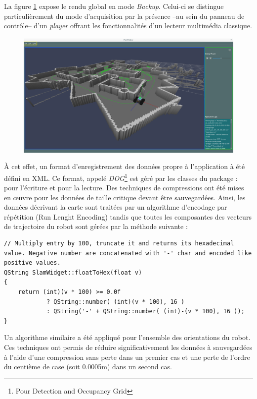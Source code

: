 La figure \ref{fig:replay} expose le rendu global en mode \emph{Backup}. 
Celui-ci se distingue particulièrement du mode d'acquisition par la présence --au sein du panneau de contrôle-- d'un \emph{player} offrant les fonctionnalités d'un lecteur multimédia classique.

\begin{figure}[h]  
  \centering
    \includegraphics[width=1.\linewidth]{figures/slam-backup}  
  \label{fig:replay}
\end{figure}

\`{A} cet effet, un format d'enregistrement des données propre à l'application à été défini en \gls{XML}.
Ce format, appelé \emph{DOG}\footnote{Pour Detection and Occupancy Grid} est géré par les classes du package  :  pour l'écriture et  pour la lecture. 
Des techniques de compressions ont été mises en \oe{}uvre pour les données de taille critique devant être sauvegardées. 
Ainsi, les données décrivant la carte sont traitées par un algorithme d'encodage par répétition (Run Lenght Encoding) tandis que toutes les composantes des vecteurs de trajectoire du robot sont gérées par la méthode suivante :

\begin{lstlisting}[style=customcpp]
// Multiply entry by 100, truncate it and returns its hexadecimal value. Negative number are concatenated with '-' char and encoded like positive values.
QString SlamWidget::floatToHex(float v)
{
    return (int)(v * 100) >= 0.0f
            ? QString::number( (int)(v * 100), 16 )
            : QString('-' + QString::number( (int)-(v * 100), 16 ));
}
\end{lstlisting}

Un algorithme similaire a été appliqué pour l'ensemble des orientations du robot. 
Ces techniques ont permis de réduire significativement les données à sauvegardées à l'aide d'une compression sans perte dans un  premier cas et une perte de l'ordre du centième de case (soit 0.0005m) dans un second cas.  
  

